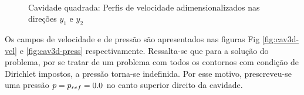 \documentclass[tese_patricia]{subfiles}%
\begin{document}
\begin{figure}[!t]
	 \\
	\caption{Cavidade quadrada: Perfis de velocidade adimensionalizados nas direções $y_1$ e $y_2$  }
	\label{fig:cavidade_graficos}
\end{figure}

Os campos de velocidade e de pressão são apresentados nas figuras Fig \ref{fig:cav3d-vel} e \ref{fig:cav3d-press} respectivamente. Ressalta-se que para a solução do problema, por se tratar de um problema com todos os contornos com condição de Dirichlet impostos, a pressão torna-se indefinida. Por esse motivo, prescreveu-se uma pressão $p = p_{ref} =  0.0$ no canto superior direito da cavidade. 
\end{document}
